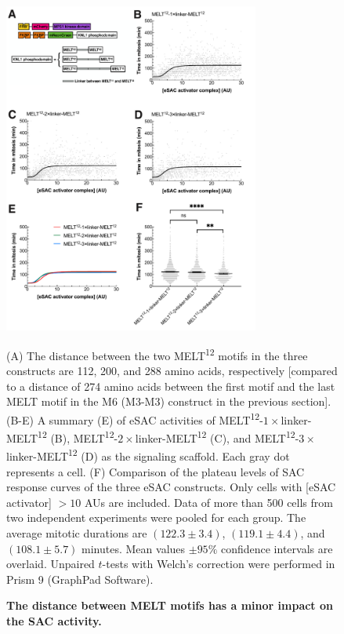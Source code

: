 \begin{figure}
    \centering
    \includegraphics[width=0.75\textwidth]{chapters/figures/DistanceEffect.pdf}
    \caption{\textbf{The distance between MELT motifs has a minor impact on the SAC activity.}}
    \noindent\justifying (A) The distance between the two MELT\textsuperscript{12} motifs in the three constructs are 112, 200, and 288 amino acids, respectively [compared to a distance of 274 amino acids between the first motif and the last MELT motif in the M6 (M3-M3) construct in the previous section]. (B-E) A summary (E) of eSAC activities of MELT\textsuperscript{12}-$1\times$linker-MELT\textsuperscript{12} (B), MELT\textsuperscript{12}-$2\times$linker-MELT\textsuperscript{12} (C), and MELT\textsuperscript{12}-$3\times$linker-MELT\textsuperscript{12} (D) as the signaling scaffold. Each gray dot represents a cell. (F) Comparison of the plateau levels of SAC response curves of the three eSAC constructs. Only cells with [eSAC activator] $> 10$ AUs are included. Data of more than 500 cells from two independent experiments were pooled for each group. The average mitotic durations are $(122.3 \pm 3.4)$, $(119.1 \pm 4.4)$, and $(108.1 \pm 5.7)$ minutes. Mean values $\pm 95\%$ confidence intervals are overlaid. Unpaired $t$-tests with Welch's correction were performed in Prism 9 (GraphPad Software).
    \label{DistanceEffect}
\end{figure}


